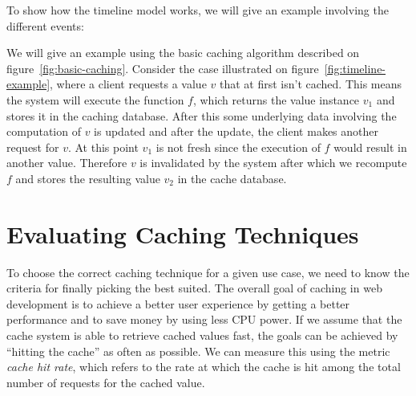 To show how the timeline model works, we will give an example involving the different events:

\begin{example}
\label{example:timeline-model}
We will give an example using the basic caching algorithm described on figure~\ref{fig:basic-caching}. Consider the case illustrated on figure~\ref{fig:timeline-example}, where a client requests a value $v$ that at first isn't cached. This means the system will execute the function $f$, which returns the value instance $v_1$ and stores it in the caching database. After this some underlying data involving the computation of $v$ is updated and after the update, the client makes another request for $v$. At this point $v_1$ is not fresh since the execution of $f$ would result in another value. Therefore $v$ is invalidated by the system after which we recompute $f$ and stores the resulting value $v_2$ in the cache database.

\begin{figure*}{ht!]
  \centering
  \texttt{[image: width=1.0\\linewidth]\{figures/timeline-example.pdf]}
  \caption{Example of the timeline model}
  \label{fig:timeline-example}
\end{figure*}

\end{example}





\section{Evaluating Caching Techniques}
\label{sec:evaluating_caching_techniques}


To choose the correct caching technique for a given use case, we need to know the criteria for finally picking the best suited. The overall goal of caching in web development is to achieve a better user experience by getting a better performance and to save money by using less CPU power. If we assume that the cache system is able to retrieve cached values fast, the goals can be achieved by ``hitting the cache'' as often as possible. We can measure this using the metric \emph{cache hit rate}, which refers to the rate at which the cache is hit among the total number of requests for the cached value.

